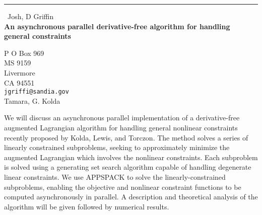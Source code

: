 \documentclass{report}
\begin{document}
\begin{center}
\rule{6in}{1pt} \
{\large Josh, D Griffin \\
{\bf An asynchronous parallel derivative-free algorithm for handling general constraints }}

P O Box 969 \\ MS 9159 \\ Livermore \\ CA 94551
\\
{\tt jgriffi@sandia.gov}\\
Tamara, G. Kolda\end{center}

We will discuss an asynchronous parallel implementation of a
derivative-free augmented Lagrangian algorithm for handling general
nonlinear constraints recently proposed by Kolda, Lewis, and Torczon. The
method solves a series of linearly constrained subproblems, seeking to
approximately minimize the augmented Lagrangian which involves the
nonlinear constraints. Each subproblem is solved using a generating set
search algorithm capable of handling degenerate linear constraints. We
use APPSPACK to solve the linearly-constrained subproblems, enabling the
objective and nonlinear constraint functions to be computed
asynchronously in parallel. A description and theoretical analysis of the
algorithm will be given followed by numerical results.
\end{document}
